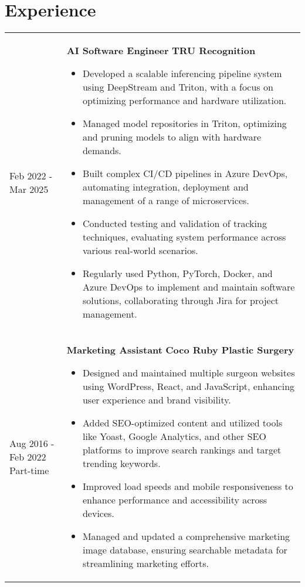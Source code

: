 \documentclass[10pt]{article}
\begin{document}
\section{Experience}
\begin{longtable}[H]{l l}
	\parbox[t]{0.175\textwidth}{
		Feb 2022 - Mar 2025
	}
	&
	\parbox[t]{0.825\textwidth}{
		\textbf{AI Software Engineer}
		\hfill
		{\footnotesize \textbf{TRU Recognition}}\\
		\begin{itemize}
			\item Developed a scalable inferencing pipeline system using DeepStream and Triton, with a focus on optimizing performance and hardware utilization.
			\item Managed model repositories in Triton, optimizing and pruning models to align with hardware demands.
			\item Built complex CI/CD pipelines in Azure DevOps, automating integration, deployment and management of a range of microservices.
			\item Conducted testing and validation of tracking techniques, evaluating system performance across various real-world scenarios.
			\item Regularly used Python, PyTorch, Docker, and Azure DevOps to implement and maintain software solutions, collaborating through Jira for project management.
		\end{itemize}
	}
	\\
	\parbox[t]{0.175\textwidth}{
		Aug 2016 - Feb 2022
		Part-time
	}
	&
	\parbox[t]{0.825\textwidth}{
		\textbf{Marketing Assistant}
		\hfill
		{\footnotesize \textbf{Coco Ruby Plastic Surgery}}\\
		\begin{itemize}
			\item Designed and maintained multiple surgeon websites using WordPress, React, and JavaScript, enhancing user experience and brand visibility.
			\item Added SEO-optimized content and utilized tools like Yoast, Google Analytics, and other SEO platforms to improve search rankings and target trending keywords.
			\item  Improved load speeds and mobile responsiveness to enhance performance and accessibility across devices.
			\item Managed and updated a comprehensive marketing image database, ensuring searchable metadata for streamlining marketing efforts.
		\end{itemize}
	}
	\\

\end{longtable}
\end{document}
